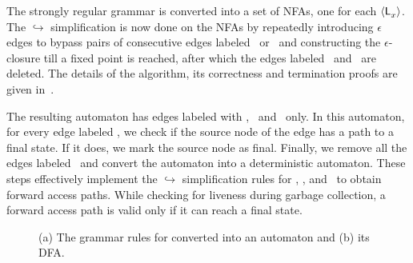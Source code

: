 The strongly regular grammar is converted  into a set of NFAs, one for
each $\langle \mathsf{L}_{{x}}^{}\rangle$.  The  $\hookrightarrow$ simplification is now
done on the NFAs by  repeatedly introducing $\epsilon$ edges to bypass
pairs  of consecutive  edges  labeled \bcar\acar\  or \bcdr\acdr\  and
constructing  the $\epsilon$-closure  till a  fixed point  is reached,
after which  the edges labeled  \bcar \  and \bcdr\ are  deleted.  The
details of the  algorithm, its correctness and  termination proofs are
given in~\cite{karkare07liveness,asati14lgc}.

The resulting automaton has edges labeled with \acar, \acdr\ and
\clazy\ only.  In this  automaton, for every  edge labeled  \clazy, we
check if the source node of the edge  has a path to a final state.  If
it does, we mark the source node  as final. Finally, we remove all the
edges labeled \clazy\  and convert the automaton  into a deterministic
automaton.   These steps  effectively implement  the $\hookrightarrow$
simplification rules for \bcar, \bcdr, and
\clazy\ to  obtain forward access paths.  While checking for  liveness during
garbage collection,  a forward  access path  is valid  only if  it can
reach a final state.


\begin{wrapfigure}{r}{0.25\textwidth}
\caption{(a) The  grammar rules for 
  converted      into      an      automaton     and      (b)      its
  DFA.}\label{fig:example-automata}
\figrule
\vspace*{-5mm}
\end{wrapfigure}

